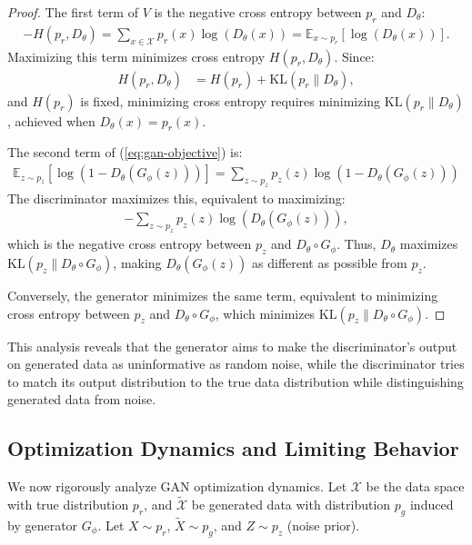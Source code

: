 \begin{proof}
	The first term of $V$ is the negative cross entropy between $p_r$ and $D_\theta$:
	\begin{align}
		\label{eq:neg-cross-entropy}
		- H(p_r, D_\theta) = \sum_{x \in \mathcal{X}} p_r(x)\log(D_\theta(x)) = \mathbb{E}_{x \sim p_r} [\log(D_\theta(x))].
	\end{align}
	Maximizing this term minimizes cross entropy $H(p_r, D_\theta)$. Since:
	\begin{align}
		H(p_r, D_\theta) & = H(p_r) + \text{KL}(p_r \| D_\theta),
	\end{align}
	and $H(p_r)$ is fixed, minimizing cross entropy requires minimizing $\text{KL}(p_r \| D_\theta)$, achieved when $D_\theta(x) = p_r(x)$.

	The second term of (\ref{eq:gan-objective}) is:
	\begin{align}
		\mathbb{E}_{z \sim p_z}[\log(1 - D_\theta(G_\phi(z)))] = \sum_{z \sim p_z} p_z(z) \log (1 - D_\theta(G_\phi(z)))
	\end{align}
	The discriminator maximizes this, equivalent to maximizing:
	\begin{align}
		-\sum_{z \sim p_z} p_z(z) \log (D_\theta(G_\phi(z))),
	\end{align}
	which is the negative cross entropy between $p_z$ and $D_\theta \circ G_\phi$. Thus, $D_\theta$ maximizes $\text{KL}(p_z \| D_\theta \circ G_\phi)$, making $D_\theta(G_\phi(z))$ as different as possible from $p_z$.

	Conversely, the generator minimizes the same term, equivalent to minimizing cross entropy between $p_z$ and $D_\theta \circ G_\phi$, which minimizes $\text{KL}(p_z \| D_\theta \circ G_\phi)$.
\end{proof}

This analysis reveals that the generator aims to make the discriminator's output on generated data as uninformative as random noise, while the discriminator tries to match its output distribution to the true data distribution while distinguishing generated data from noise.

\subsection{Optimization Dynamics and Limiting Behavior}%
\label{sec:optimization-dynamics}%

We now rigorously analyze GAN optimization dynamics. Let $\mathcal{X}$ be the data space with true distribution $p_r$, and $\tilde{\mathcal{X}}$ be generated data with distribution $p_g$ induced by generator $G_\phi$. Let $X \sim p_r$, $\tilde{X} \sim p_g$, and $Z \sim p_z$ (noise prior).

